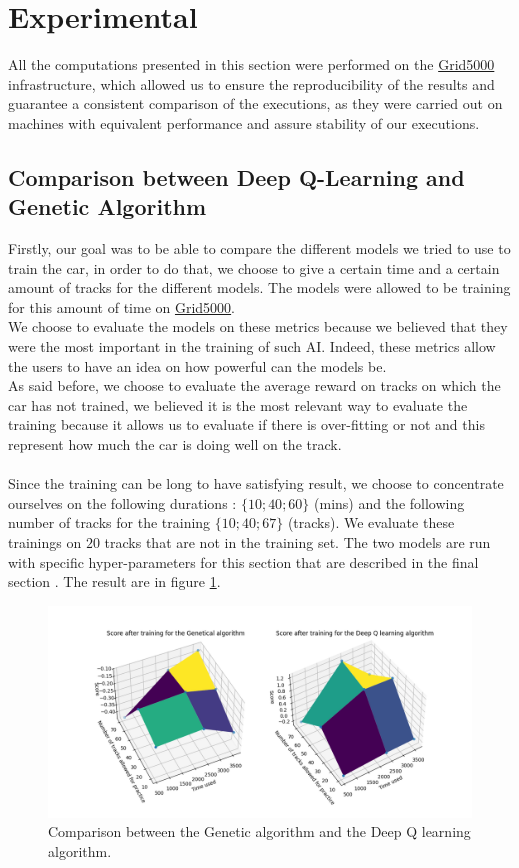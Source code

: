 \documentclass[11pt,a4paper]{article}
\newcounter{fig}
\begin{document}
    \section*{Experimental}
All the computations presented in this section were performed on the \href{https://www.grid5000.fr}{Grid5000} infrastructure, which allowed us to ensure the reproducibility of the results and guarantee a consistent comparison of the executions, as they were carried out on machines with equivalent performance and assure stability of our executions.

		\subsection*{Comparison between Deep Q-Learning and Genetic Algorithm}
Firstly, our goal was to be able to compare the different models we tried to use to train the car, in order to do that, we choose to give a certain time and a certain amount of tracks for the different models. The models were allowed to be training for this amount of time on \href{https://www.grid5000.fr}{Grid5000}.\\
We choose to evaluate the models on these metrics because we believed that they were the most important in the training of such AI. Indeed, these metrics allow the users to have an idea on how powerful can the models be.\\
As said before, we choose to evaluate the average reward on tracks on which the car has not trained, we believed it is the most relevant way to evaluate the training because it allows us to evaluate if there is over-fitting or not and this represent how much the car is doing well on the track.\\
\\
Since the training can be long to have satisfying result, we choose to concentrate ourselves on the following durations : $\{10;40;60\}$ (mins) and the following number of tracks for the training $\{10;40;67\}$ (tracks). We evaluate these trainings on $20$ tracks that are not in the training set. The two models are run with specific hyper-parameters for this section that are described in the final section \pageref{Hyperparameters}. The result are in figure \ref{figure:comparaison GA VS DQ}.
        \begin{figure}[ht]
            \centering
            \includegraphics[scale = 0.65]{graphe_comparaison.png}
            \caption{Comparison between the Genetic algorithm and the Deep Q learning algorithm.}
            \label{figure:comparaison GA VS DQ}
        \end{figure}
\end{document}
